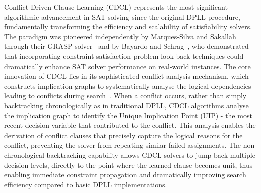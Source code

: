 Conflict-Driven Clause Learning (CDCL) represents the most significant algorithmic advancement in SAT solving since the original DPLL procedure, fundamentally transforming the efficiency and scalability of satisfiability solvers. The paradigm was pioneered independently by Marques-Silva and Sakallah through their GRASP solver~\cite{marques1999grasp} and by Bayardo and Schrag~\cite{bayardo1997using}, who demonstrated that incorporating constraint satisfaction problem look-back techniques could dramatically enhance SAT solver performance on real-world instances. The core innovation of CDCL lies in its sophisticated conflict analysis mechanism, which constructs implication graphs to systematically analyse the logical dependencies leading to conflicts during search~\cite{marques2009handbook}. When a conflict occurs, rather than simply backtracking chronologically as in traditional DPLL, CDCL algorithms analyse the implication graph to identify the Unique Implication Point (UIP) - the most recent decision variable that contributed to the conflict. This analysis enables the derivation of conflict clauses that precisely capture the logical reasons for the conflict, preventing the solver from repeating similar failed assignments. The non-chronological backtracking capability allows CDCL solvers to jump back multiple decision levels, directly to the point where the learned clause becomes unit, thus enabling immediate constraint propagation and dramatically improving search efficiency compared to basic DPLL implementations.

